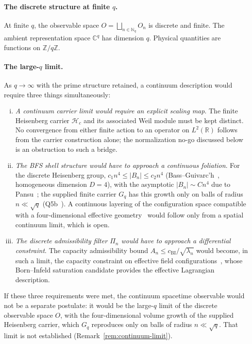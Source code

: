 \documentclass[11pt,a4paper]{article}
\begin{document}
  \paragraph{The discrete structure at finite $q$.}
    At finite $q$, the observable space $O = \bigsqcup_{n \in \mathbb{N}_q} O_n$
    is discrete and finite.
    The ambient representation space $\mathbb{C}^q$ has dimension $q$.
    Physical quantities are functions on $\mathbb{Z}/q\mathbb{Z}$.

  \paragraph{The large-$q$ limit.}
    As $q \to \infty$ with the prime structure retained, a continuum description would require
    three things simultaneously:
    \begin{enumerate}[(i)]
\item \emph{A continuum carrier limit would require an explicit scaling map}.
The finite Heisenberg carrier $\mathcal{H}_c$ and its associated Weil module
must be kept distinct.
No convergence from either finite action to an operator on $L^2(\mathbb{R})$
follows from the carrier construction alone; the normalization no-go discussed
below is an obstruction to such a bridge.
\item \emph{The BFS shell structure would have to approach a continuous foliation}.
For the discrete Heisenberg group, $c_1 n^4 \le |B_n| \le c_2 n^4$ (Bass--Guivarc'h~\cite{Bass1972,Guivarch1973},
homogeneous dimension $D = 4$), with the asymptotic $|B_n| \sim C n^4$ due to Pansu~\cite{Pansu1983}; the supplied
finite carrier $G_q$ has this growth only on balls of radius $n \ll \sqrt{q}$ (Q5b~\cite{Beau2026q5b}).
A continuous layering of the configuration
space compatible with a four-dimensional effective geometry~\cite{Cosmochrony} would
follow only from a spatial continuum limit, which is open.
\item \emph{The discrete admissibility filter $\Pi_n$ would have to approach a
differential constraint}.
The capacity admissibility bound $A_n \leq c_{\mathrm{BI}}/\sqrt{\lambda_n}$
would become, in such a limit, the capacity constraint on effective field
configurations~\cite{Beau2026c}, whose Born--Infeld saturation candidate
provides the effective Lagrangian description.
    \end{enumerate}

    If these three requirements were met, the continuum spacetime observable would not be a
    separate postulate: it would be the large-$q$ limit of the discrete observable space $O$,
    with the four-dimensional volume growth of the supplied Heisenberg carrier, which $G_q$ reproduces only on
    balls of radius $n \ll \sqrt{q}$.
    That limit is not established (Remark~\ref{rem:continuum-limit}).
\end{document}
